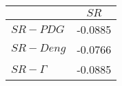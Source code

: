 \begin{tabular}{l|c}
\toprule
{} &    $SR$ \\
\midrule
\textbf{$SR-PDG$   } & -0.0885 \\
\textbf{$SR-Deng$  } & -0.0766 \\
\textbf{$SR-\Gamma$} & -0.0885 \\
\bottomrule
\end{tabular}
